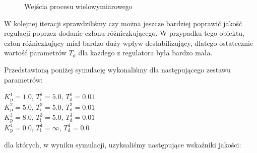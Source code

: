 \begin{figure}
    \begin{subfigure}[b]{\textwidth}
        \centering
    \end{subfigure}

    \caption{Wejścia procesu wielowymiarowego}
    \label{pro_pid_konf2_in2}
\end{figure}
\FloatBarrier

W kolejnej iteracji sprawdziliśmy czy można jeszcze bardziej poprawić jakość
regulacji poprzez dodanie członu różniczkującego. W przypadku tego obiektu,
człon różniczkujący miał bardzo duży wpływ destabilizujący, dlatego ostatecznie
wartość parametrów $T_{\mathrm{d}}$ dla każdego z regulatora była bardzo mała.

Przedstawioną poniżej symulację wykonaliśmy dla następującego zestawu parametrów:

\begin{center}
    $K^{\num{1}}_{\mathrm{p}} = \num{1.0}$, $T^{\num{1}}_{\mathrm{i}} = \num{5.0}$, $T^{\num{1}}_{\mathrm{d}} = \num{0.01}$ \\
    $K^{\num{2}}_{\mathrm{p}} = \num{5.0}$, $T^{\num{2}}_{\mathrm{i}} = \num{5.0}$, $T^{\num{2}}_{\mathrm{d}} = \num{0.01}$ \\
    $K^{\num{3}}_{\mathrm{p}} = \num{8.0}$, $T^{\num{3}}_{\mathrm{i}} = \num{5.0}$, $T^{\num{3}}_{\mathrm{d}} = \num{0.01}$ \\
    $K^{\num{4}}_{\mathrm{p}} = \num{0.0}$, $T^{\num{4}}_{\mathrm{i}} = \infty$, $T^{\num{4}}_{\mathrm{d}} = \num{0.0}$ \\
\end{center}

dla których, w wyniku symulacji, uzyksaliśmy następujące wskaźniki jakości:\\

